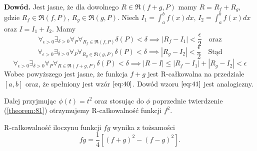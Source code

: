 \documentclass[leqno]{article}
\newcommand{\proof}{\noindent\textbf{Dowód. }}
\begin{document}
\begin{justify}
\proof{} Jest jasne, że dla dowolnego $R \in \mathfrak{R}(f+g, P)$ mamy $R = R_f + R_g$, gdzie $R_f \in \mathfrak{R}(f, P)$, $R_g \in \mathfrak{R}(g, P)$.
Niech $I_1 = \int_{a}^{b}f(x)dx$, $I_2 = \int_{a}^{b}f(x)dx$ oraz $I = I_1 + I_2$. Mamy
\[
    \forall_{\epsilon > 0} \exists_{\delta > 0} \forall_P \forall_{R_f \in \mathfrak{R}(f, P)} \delta(P) < \delta \implies |R_f - I_1| < \frac{\epsilon}{2} \quad \text{oraz}
\]
\[
    \forall_{\epsilon > 0} \exists_{\delta > 0} \forall_P \forall_{R_g \in \mathfrak{R}(g, P)} \delta(P) < \delta \implies |R_g - I_2| < \frac{\epsilon}{2} \quad \text{Stąd}
\]
\[
    \forall_{\epsilon > 0} \exists_{\delta > 0} \forall_P \forall_{R \in \mathfrak{R}(f+g, P)} \delta(P) < \delta \implies |R - I| \leq |R_f - I_1| + |R_g - I_2| < \epsilon
\]
Wobec powyższego jest jasne, że funkcja $f + g$ jest R-całkowalna na przedziale $[a,b]$ oraz, że spełniony jest wzór $\ref{eq:40}$.
Dowód wzoru $\ref{eq:41}$ jest analogiczny.

\noindent
Dalej przyjmując $\phi(t) = t^2$ oraz stosując do $\phi$ poprzednie twierdzenie (\ref{theorem:81}) otrzymujemy
R-całkowalność funkcji $f^2$.

\noindent
R-całkowalność iloczynu funkcji $fg$ wynika z tożsamości
\[
    fg = \frac{1}{4}[{(f+g)}^2 - {(f-g)}^2].
\]

\end{justify}
\end{document}
